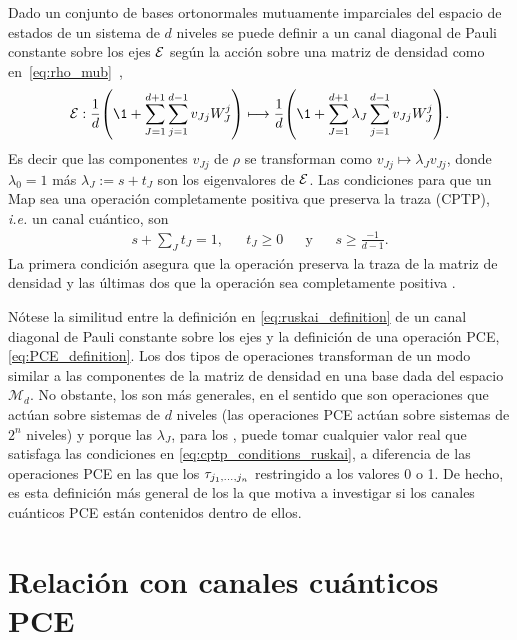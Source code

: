 Dado un conjunto de bases ortonormales mutuamente imparciales del 
espacio de estados de un sistema de $d$ niveles se
puede definir a un canal diagonal de Pauli constante sobre los ejes $\mathcal{E}$ 
según la acción sobre una matriz de densidad como 
en~\eqref{eq:rho_mub}~\cite{nathanson2007pauli},
\begin{align}\label{eq:ruskai_definition}
	\E :  \frac{1}{d}\qty(\1+\sum_{J=1}^{d+1}\sum_{j=1}^{d-1} v_{Jj}W_J^j)
	\longmapsto 
	\frac{1}{d}\qty(\1+\sum_{J=1}^{d+1}\lambda_J\sum_{j=1}^{d-1} v_{Jj}W_J^j).
\end{align}
Es decir que las componentes $v_{Jj}$ de $\rho$ se transforman como 
$v_{Jj}\mapsto\lambda_Jv_{Jj}$, donde $\lambda_0=1$ más $\lambda_J:=s+t_J$ son
los eigenvalores de $\mathcal{E}$. Las 
condiciones para que un \ruskai{}{}{}Map{} sea una operación 
completamente positiva que preserva la traza (CPTP), \textit{i.e.} un canal cuántico,
son
\begin{align}\label{eq:cptp_conditions_ruskai}
	s+\sum_{J}t_J=1, && t_J\geq0 && \text{y} && s\geq\frac{-1}{d-1}.
\end{align}
La primera condición asegura que la operación preserva la traza de la matriz 
de densidad y las últimas dos que la operación sea completamente positiva
\cite{nathanson2007pauli}.

Nótese la similitud entre la definición en \eqref{eq:ruskai_definition} 
de un canal diagonal de Pauli constante
sobre los ejes y la definición de una operación PCE, \eqref{eq:PCE_definition}.
Los dos tipos de operaciones transforman de 
un modo similar a las componentes de la matriz de densidad en una 
base dada del espacio $\mathcal{M}_d$.
No obstante, los \ruskai{} son más generales, en el sentido que son
operaciones que actúan sobre sistemas de $d$ niveles (las 
operaciones PCE actúan sobre sistemas de $2^n$ niveles) y porque 
las $\lambda_J$, para los \ruskai{}, puede tomar cualquier valor real que 
satisfaga las condiciones en \eqref{eq:cptp_conditions_ruskai}, a diferencia
de las operaciones PCE en las que los $\tau_{j_1,\ldots ,j_n}$ restringido a los valores 0 o 1.
De hecho, es esta definición más general de los \ruskai{} la que motiva a
investigar si los canales cuánticos PCE están contenidos dentro de ellos.

\section{Relación con canales cuánticos PCE} \label{sec:ch4_PCEnotRuskai}%

